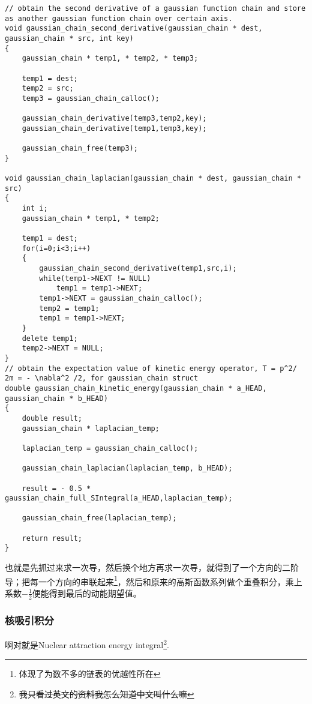\documentclass[12pt,a4paper,openany,twoside]{article}
\numberwithin{equation}{section}
\begin{document}
                \begin{lstlisting}
// obtain the second derivative of a gaussian function chain and store as another gaussian function chain over certain axis.
void gaussian_chain_second_derivative(gaussian_chain * dest, gaussian_chain * src, int key)
{
    gaussian_chain * temp1, * temp2, * temp3;

    temp1 = dest;
    temp2 = src;
    temp3 = gaussian_chain_calloc();
    
    gaussian_chain_derivative(temp3,temp2,key);
    gaussian_chain_derivative(temp1,temp3,key);

    gaussian_chain_free(temp3);
}

void gaussian_chain_laplacian(gaussian_chain * dest, gaussian_chain * src)
{
    int i;
    gaussian_chain * temp1, * temp2;

    temp1 = dest;
    for(i=0;i<3;i++)
    {
        gaussian_chain_second_derivative(temp1,src,i);
        while(temp1->NEXT != NULL)
            temp1 = temp1->NEXT;
        temp1->NEXT = gaussian_chain_calloc();
        temp2 = temp1;
        temp1 = temp1->NEXT;
    }
    delete temp1;
    temp2->NEXT = NULL;
}
// obtain the expectation value of kinetic energy operator, T = p^2/ 2m = - \nabla^2 /2, for gaussian_chain struct
double gaussian_chain_kinetic_energy(gaussian_chain * a_HEAD, gaussian_chain * b_HEAD)
{
    double result;
    gaussian_chain * laplacian_temp;

    laplacian_temp = gaussian_chain_calloc();

    gaussian_chain_laplacian(laplacian_temp, b_HEAD);

    result = - 0.5 * gaussian_chain_full_SIntegral(a_HEAD,laplacian_temp);

    gaussian_chain_free(laplacian_temp);

    return result;
}
                \end{lstlisting}
                也就是先抓过来求一次导，然后换个地方再求一次导，就得到了一个方向的二阶导；把每一个方向的串联起来\footnote{体现了为数不多的链表的优越性所在}，然后和原来的高斯函数系列做个重叠积分，乘上系数$-\frac{1}{2}$便能得到最后的动能期望值。


                \subsubsection{核吸引积分}
                啊对就是Nuclear attraction energy integral\footnote{\sout{我只看过英文的资料我怎么知道中文叫什么嘛}}.
\end{document}
